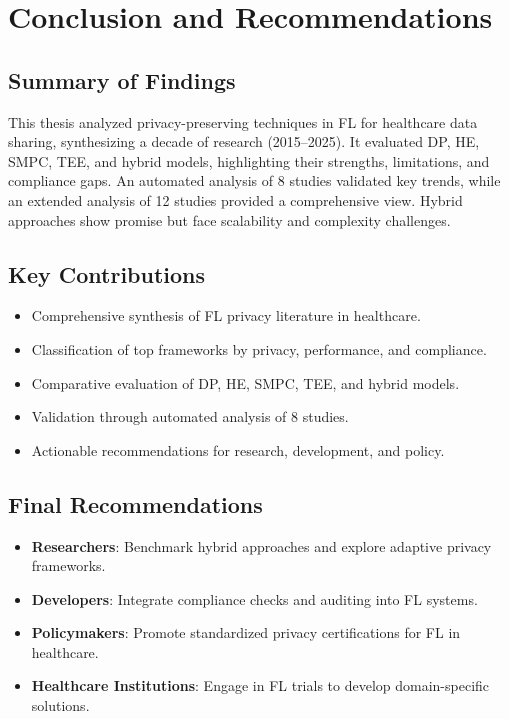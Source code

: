 \documentclass[12pt]{report}
\begin{document}
{\chapter{Conclusion and Recommendations}

\section{Summary of Findings}
This thesis analyzed privacy-preserving techniques in FL for healthcare data sharing, synthesizing a decade of research (2015–2025). It evaluated DP, HE, SMPC, TEE, and hybrid models, highlighting their strengths, limitations, and compliance gaps. An automated analysis of 8 studies validated key trends, while an extended analysis of 12 studies provided a comprehensive view. Hybrid approaches show promise but face scalability and complexity challenges.

\section{Key Contributions}
\begin{itemize}
    \item Comprehensive synthesis of FL privacy literature in healthcare.
    \item Classification of top frameworks by privacy, performance, and compliance.
    \item Comparative evaluation of DP, HE, SMPC, TEE, and hybrid models.
    \item Validation through automated analysis of 8 studies.
    \item Actionable recommendations for research, development, and policy.
\end{itemize}

\section{Final Recommendations}
\begin{itemize}
    \item \textbf{Researchers}: Benchmark hybrid approaches and explore adaptive privacy frameworks.
    \item \textbf{Developers}: Integrate compliance checks and auditing into FL systems.
    \item \textbf{Policymakers}: Promote standardized privacy certifications for FL in healthcare.
    \item \textbf{Healthcare Institutions}: Engage in FL trials to develop domain-specific solutions.
\end{itemize}

}
\end{document}
